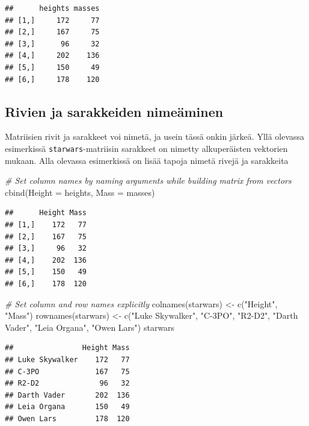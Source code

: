 \documentclass[
]{book}
\newenvironment{Shaded}{\begin{snugshade}}{\end{snugshade}}
\newcommand{\AttributeTok}[1]{\textcolor[rgb]{0.77,0.63,0.00}{#1}}
\newcommand{\CommentTok}[1]{\textcolor[rgb]{0.56,0.35,0.01}{\textit{#1}}}
\newcommand{\FunctionTok}[1]{\textcolor[rgb]{0.00,0.00,0.00}{#1}}
\newcommand{\NormalTok}[1]{#1}
\newcommand{\OtherTok}[1]{\textcolor[rgb]{0.56,0.35,0.01}{#1}}
\newcommand{\StringTok}[1]{\textcolor[rgb]{0.31,0.60,0.02}{#1}}
\begin{document}
\begin{verbatim}
##      heights masses
## [1,]     172     77
## [2,]     167     75
## [3,]      96     32
## [4,]     202    136
## [5,]     150     49
## [6,]     178    120
\end{verbatim}

\hypertarget{rivien-ja-sarakkeiden-nimeuxe4minen}{%
\subsection{Rivien ja sarakkeiden nimeäminen}\label{rivien-ja-sarakkeiden-nimeuxe4minen}}

Matriisien rivit ja sarakkeet voi nimetä, ja usein tässä onkin järkeä. Yllä olevassa esimerkissä \texttt{starwars}-matriisin sarakkeet on nimetty alkuperäisten vektorien mukaan. Alla olevassa esimerkissä on lisää tapoja nimetä rivejä ja sarakkeita

\begin{Shaded}
\begin{Highlighting}[]
\CommentTok{\# Set column names by naming arguments while building matrix from vectors}
\FunctionTok{cbind}\NormalTok{(}\AttributeTok{Height =}\NormalTok{ heights, }\AttributeTok{Mass =}\NormalTok{ masses)}
\end{Highlighting}
\end{Shaded}

\begin{verbatim}
##      Height Mass
## [1,]    172   77
## [2,]    167   75
## [3,]     96   32
## [4,]    202  136
## [5,]    150   49
## [6,]    178  120
\end{verbatim}

\begin{Shaded}
\begin{Highlighting}[]
\CommentTok{\# Set column and row names explicitly}
\FunctionTok{colnames}\NormalTok{(starwars) }\OtherTok{\textless{}{-}} \FunctionTok{c}\NormalTok{(}\StringTok{"Height"}\NormalTok{, }\StringTok{"Mass"}\NormalTok{)}
\FunctionTok{rownames}\NormalTok{(starwars) }\OtherTok{\textless{}{-}} \FunctionTok{c}\NormalTok{(}\StringTok{"Luke Skywalker"}\NormalTok{, }\StringTok{"C{-}3PO"}\NormalTok{, }\StringTok{"R2{-}D2"}\NormalTok{, }\StringTok{"Darth Vader"}\NormalTok{, }\StringTok{"Leia Organa"}\NormalTok{, }\StringTok{"Owen Lars"}\NormalTok{)}
\NormalTok{starwars}
\end{Highlighting}
\end{Shaded}

\begin{verbatim}
##                Height Mass
## Luke Skywalker    172   77
## C-3PO             167   75
## R2-D2              96   32
## Darth Vader       202  136
## Leia Organa       150   49
## Owen Lars         178  120
\end{verbatim}
\end{document}
